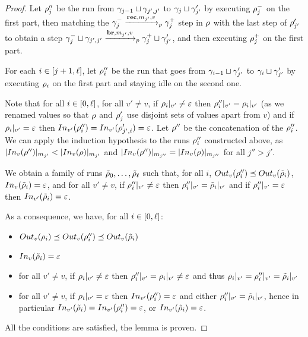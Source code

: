 \begin{proof}
	Let $\run''_j$ be the run from $\config_{j-1} \sqcup \config_{j', j'}$ to $\config_{j} \sqcup \config'_{j'}$ by executing $\run_{j}^-$ on the first part, then matching the $\config_j^- \extmessage{m_{j'}}{v} \config_j^+$ step in $\run$ with the last step of $\run'_{j'}$ to obtain a  step $\config_j^- \sqcup \config_{j', j'} \intmessage{m_{j'}}{v} \config_j^+ \sqcup \config'_{j'}$, and then executing $\run_{j}^+$ on the first part.
	
	For each $i \in \nset{j+1}{\ell}$, let $\run''_i$ be the run that goes from $\config_{i-1} \sqcup \config'_{j'}$ to $\config_{i} \sqcup \config'_{j'}$ by executing $\run_i$ on the first part and staying idle on the second one.
	
	Note that for all $i \in \nset{0}{\ell}$, for all $v' \neq v$, if $\vproj{v'}{\run_i} \neq \epsilon$ then $\vproj{v'}{\run''_i} = \vproj{v'}{\run_i}$ (as we renamed values so that $\run$ and $\run'_j$ use disjoint sets of values apart from $v$) and if $\vproj{v'}{\run_i} = \epsilon$ then $\vinput{v'}{\run''_i} = \vinput{v'}{\run'_{j',i}} = \epsilon$.
	Let $\run''$ be the concatenation of the $\run''_i$.
	We can apply the induction hypothesis to the runs $\run''_i$ constructed above, as $\size{\vinput{v}{\run''}}_{m_{j'}} < \size{\vinput{v}{\run}}_{m_{j'}}$ and $\size{\vinput{v}{\run''}}_{m_{j''}} = \size{\vinput{v}{\run}}_{m_{j''}}$ for all $j''>j'$.
	
	We obtain a family of runs $\Tilde{\run}_0, \ldots, \Tilde{\run}_\ell$ such that, for all $i$, $\voutput{v}{\run''_i} \subword \voutput{v}{\Tilde{\run}_i}$, $\vinput{v}{\Tilde{\run}_i} = \epsilon$, and for all $v' \neq v$, if $\vproj{v'}{\run''_i} \neq \epsilon$ then $\vproj{v'}{\run''_i} = \vproj{v'}{\Tilde{\run}_i}$ and if $\vproj{v'}{\run''_i} = \epsilon$ then $\vinput{v'}{\Tilde{\run}_i} = \epsilon$.
	
	As a consequence, we have, for all $i\in\nset{0}{\ell}$:
	\begin{itemize}
		\item $\voutput{v}{\run_i} \subword \voutput{v}{\run''_i} \subword \voutput{v}{\Tilde{\run}_i}$
		
		\item $\vinput{v}{\Tilde{\run}_i} = \epsilon$
		
		\item for all $v' \neq v$, if $\vproj{v'}{\run_i} \neq \epsilon$ then $\vproj{v'}{\run''_i} = \vproj{v'}{\run_i} \neq \epsilon$ and thus $\vproj{v'}{\run_i} = \vproj{v'}{\run''_i} = \vproj{v'}{\Tilde{\run}_i}$
		
		\item for all $v' \neq v$, if $\vproj{v'}{\run_i} = \epsilon$ then $\vinput{v'}{\run''_i} = \epsilon$ and either $\vproj{v'}{\run''_i} = \vproj{v'}{\Tilde{\run}_i}$, hence in particular $\vinput{v'}{\Tilde{\run}_i} = \vinput{v'}{\run''_i} = \epsilon$, or $\vinput{v'}{\Tilde{\run}_i} = \epsilon$.
	\end{itemize}

All the conditions are satisfied, the lemma is proven.
\end{proof}

